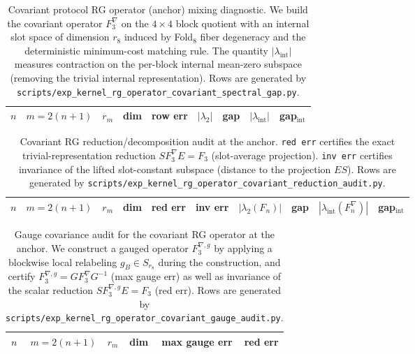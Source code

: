 \begin{table}[H]
\centering
\scriptsize
\setlength{\tabcolsep}{6pt}
\renewcommand{\arraystretch}{1.15}
\begin{tabular}{rrrrrrrrr}
\toprule
$n$ & $m=2(n+1)$ & $r_m$ & dim & row err & $|\lambda_2|$ & gap & $|\lambda_{\mathrm{int}}|$ & gap$_{\mathrm{int}}$ \\
\midrule
%
\end{tabular}
\caption{Covariant protocol RG operator (anchor) mixing diagnostic.
We build the covariant operator $F_3^\nabla$ on the $4\times4$ block quotient with an internal slot space of dimension $r_8$ induced by Fold$_8$ fiber degeneracy and the deterministic minimum-cost matching rule.
The quantity $|\lambda_{\mathrm{int}}|$ measures contraction on the per-block internal mean-zero subspace (removing the trivial internal representation).
Rows are generated by \texttt{scripts/exp\_kernel\_rg\_operator\_covariant\_spectral\_gap.py}.}
\label{tab:kernel_rg_operator_covariant_spectral_gap}
\end{table}

\begin{table}[H]
\centering
\scriptsize
\setlength{\tabcolsep}{6pt}
\renewcommand{\arraystretch}{1.15}
\begin{tabular}{rrrrrrrrrr}
\toprule
$n$ & $m=2(n+1)$ & $r_m$ & dim & red err & inv err & $|\lambda_2(F_n)|$ & gap & $|\lambda_{\mathrm{int}}(F_n^\nabla)|$ & gap$_{\mathrm{int}}$ \\
\midrule
%
\end{tabular}
\caption{Covariant RG reduction/decomposition audit at the anchor.
\texttt{red err} certifies the exact trivial-representation reduction $S F_3^\nabla E = F_3$ (slot-average projection).
\texttt{inv err} certifies invariance of the lifted slot-constant subspace (distance to the projection $ES$).
Rows are generated by \texttt{scripts/exp\_kernel\_rg\_operator\_covariant\_reduction\_audit.py}.}
\label{tab:kernel_rg_operator_covariant_reduction}
\end{table}

\begin{table}[H]
\centering
\scriptsize
\setlength{\tabcolsep}{6pt}
\renewcommand{\arraystretch}{1.15}
\begin{tabular}{rrrrrr}
\toprule
$n$ & $m=2(n+1)$ & $r_m$ & dim & max gauge err & red err \\
\midrule
%
\end{tabular}
\caption{Gauge covariance audit for the covariant RG operator at the anchor.
We construct a gauged operator $F_3^{\nabla,g}$ by applying a blockwise local relabeling $g_B\in S_{r_8}$ during the construction, and certify $F_3^{\nabla,g}=G F_3^\nabla G^{-1}$ (max gauge err) as well as invariance of the scalar reduction $S F_3^{\nabla,g} E = F_3$ (red err).
Rows are generated by \texttt{scripts/exp\_kernel\_rg\_operator\_covariant\_gauge\_audit.py}.}
\label{tab:kernel_rg_operator_covariant_gauge_audit}
\end{table}

